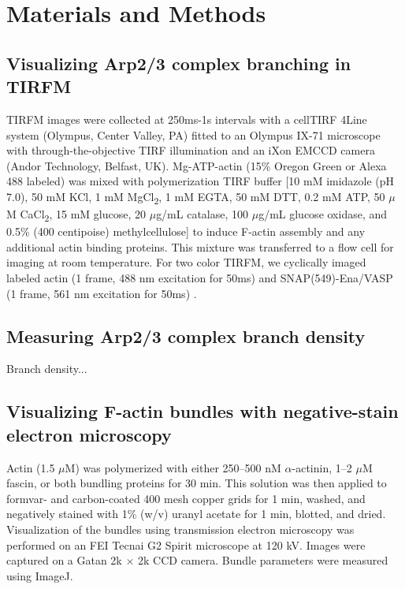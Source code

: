 \section{Materials and Methods}\label{bundlers-matmeth}

\subsection{Visualizing Arp2/3 complex branching in TIRFM}
TIRFM images were collected at 250ms-1s intervals with a cellTIRF 4Line system (Olympus, Center Valley, PA) fitted to an Olympus IX-71 microscope with through-the-objective TIRF illumination and an iXon EMCCD camera (Andor Technology, Belfast, UK). Mg-ATP-actin (15\% Oregon Green or Alexa 488 labeled) was mixed with polymerization TIRF buffer [10 mM imidazole (pH 7.0), 50 mM KCl, 1 mM MgCl\textsubscript{2}, 1 mM EGTA, 50 mM DTT, 0.2 mM ATP, 50 $\mu$M CaCl\textsubscript{2}, 15 mM glucose, 20 $\mu$g/mL catalase, 100 $\mu$g/mL glucose oxidase, and 0.5\% (400 centipoise) methylcellulose] to induce F-actin assembly and any additional actin binding proteins. This mixture was transferred to a flow cell for imaging at room temperature. For two color TIRFM, we cyclically imaged labeled actin (1 frame, 488 nm excitation for 50ms) and SNAP(549)-Ena/VASP (1 frame, 561 nm excitation for 50ms) \citep{winkelman_ena/vasp_2014}.
\subsection{Measuring Arp2/3 complex branch density}
Branch density...

\subsection{Visualizing F-actin bundles with negative-stain electron microscopy}
Actin (1.5 $\mu$M) was polymerized with either 250–500 nM $\alpha$-actinin, 1–2 $\mu$M fascin, or both bundling proteins for 30 min. This solution was then applied to formvar- and carbon-coated 400 mesh copper grids for 1 min, washed, and negatively stained with 1\% (w/v) uranyl acetate for 1 min, blotted, and dried. Visualization of the bundles using transmission electron microscopy was performed on an FEI Tecnai G2 Spirit microscope at 120 kV. Images were captured on a Gatan 2k $\times$ 2k CCD camera. Bundle parameters were measured using ImageJ.

